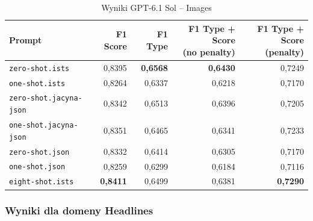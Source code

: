 \documentclass[a4paper,10pt]{article}
\begin{document}
\begin{table}[htbp]
    \centering
    \small
    \caption{Wyniki GPT-6.1 Sol -- Images}
    \label{tab:sol_images}
    \begin{tabular}{lrrrr}
        \toprule
        Prompt
        & F1 Score
        & F1 Type
        & \shortstack{F1 Type + Score\\(no penalty)}
        & \shortstack{F1 Type + Score\\(penalty)} \\
        \midrule
        \texttt{zero-shot.ists}
            & 0,8395
            & \textbf{0,6568}
            & \textbf{0,6430}
            & 0,7249 \\
        \texttt{one-shot.ists}
            & 0,8264 & 0,6337 & 0,6218 & 0,7170 \\
        \texttt{zero-shot.jacyna-json}
            & 0,8342 & 0,6513 & 0,6396 & 0,7205 \\
        \texttt{one-shot.jacyna-json}
            & 0,8351 & 0,6465 & 0,6341 & 0,7233 \\
        \texttt{zero-shot.json}
            & 0,8332 & 0,6414 & 0,6305 & 0,7170 \\
        \texttt{one-shot.json}
            & 0,8259 & 0,6299 & 0,6184 & 0,7116 \\
        \texttt{eight-shot.ists}
            & \textbf{0,8411}
            & 0,6499
            & 0,6381
            & \textbf{0,7290} \\
        \bottomrule
    \end{tabular}
\end{table}


\subsubsection{Wyniki dla domeny Headlines}
\end{document}
